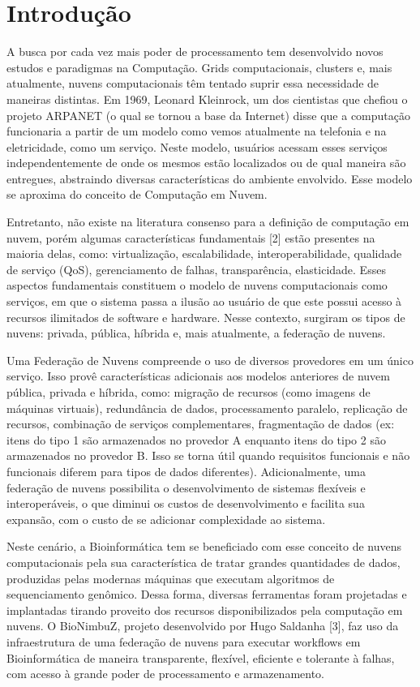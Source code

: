 \textual

\chapter{Introdução} \label{1title}
	
A busca por cada vez mais poder de processamento tem desenvolvido novos estudos e paradigmas na Computação. Grids computacionais, clusters e, mais atualmente, nuvens computacionais têm tentado suprir essa necessidade de maneiras distintas. Em 1969, Leonard Kleinrock, um dos cientistas que chefiou o projeto ARPANET (o qual se tornou a base da Internet) disse que a computação funcionaria a partir de um modelo como vemos atualmente na telefonia e na eletricidade, como um serviço. Neste modelo, usuários acessam esses serviços independentemente de onde os mesmos estão localizados ou de qual maneira são entregues, abstraindo diversas características do ambiente envolvido. Esse modelo se aproxima do conceito de Computação em Nuvem.

Entretanto, não existe na literatura consenso para a definição de computação em nuvem, porém algumas características fundamentais [2] estão presentes na maioria delas, como: virtualização, escalabilidade, interoperabilidade, qualidade de serviço (QoS), gerenciamento de falhas, transparência, elasticidade. Esses aspectos fundamentais constituem o modelo de nuvens computacionais como serviços, em que o sistema passa a ilusão ao usuário de que este possui acesso à recursos ilimitados de software e hardware. Nesse contexto, surgiram os tipos de nuvens: privada, pública, híbrida e, mais atualmente, a federação de nuvens. 

Uma Federação de Nuvens compreende o uso de diversos provedores em um único serviço. Isso provê características adicionais aos modelos anteriores de nuvem pública, privada e híbrida, como: migração de recursos (como imagens de máquinas virtuais), redundância de dados, processamento paralelo, replicação de recursos, combinação de serviços complementares, fragmentação de dados (ex: itens do tipo 1 são armazenados no provedor A enquanto itens do tipo 2 são armazenados no provedor B. Isso se torna útil quando requisitos funcionais e não funcionais diferem para tipos de dados diferentes). Adicionalmente, uma federação de nuvens possibilita o desenvolvimento de sistemas flexíveis e interoperáveis, o que diminui os custos de desenvolvimento e facilita sua expansão, com o custo de se adicionar complexidade ao sistema.

Neste cenário, a Bioinformática tem se beneficiado com esse conceito de nuvens computacionais pela sua característica de tratar grandes quantidades de dados, produzidas pelas modernas máquinas que executam algoritmos de sequenciamento genômico. Dessa forma, diversas ferramentas foram projetadas e implantadas tirando proveito dos recursos disponibilizados pela computação em nuvens. O BioNimbuZ, projeto desenvolvido por Hugo Saldanha [3], faz uso da infraestrutura de uma federação de nuvens para executar workflows em Bioinformática de maneira transparente, flexível, eficiente e tolerante à falhas, com acesso à grande poder de processamento e armazenamento.

